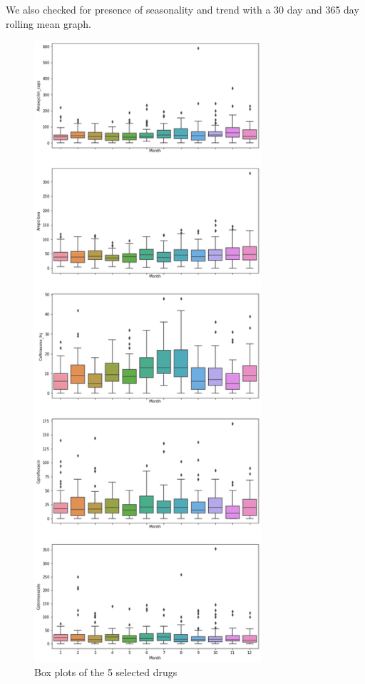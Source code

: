 \documentclass[12pt]{report}
\begin{document}
 We also checked for presence of seasonality and trend with a 30 day and 365 day rolling mean graph. 


\begin{figure}[H]%
  \begin {center}
  \includegraphics[width=0.75\textwidth]{images/download.png}
  \caption{Box plots of the 5 selected drugs}
  \label{fig:ecg}
  \end {center}
\end{figure}
\end{document}
